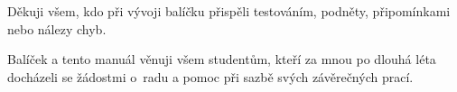 \documentclass[%
final%
,htext%
]{ipothes}
\begin{document}
\begin{acknowledgement}
  Děkuji všem, kdo při vývoji balíčku \uv{\ipotname} přispěli testováním,
  podněty, připomínkami nebo nálezy chyb.
\end{acknowledgement}


\begin{dedication*}
  Balíček \uv{\ipotname} a tento manuál věnuji všem studentům, kteří za mnou
  po dlouhá léta docházeli se žádostmi o~radu a pomoc při sazbě svých
  závěrečných prací.
\end{dedication*}


\tableofcontents


\listoffigures
\listoftables


\mainmatter %


%


\end{document}
